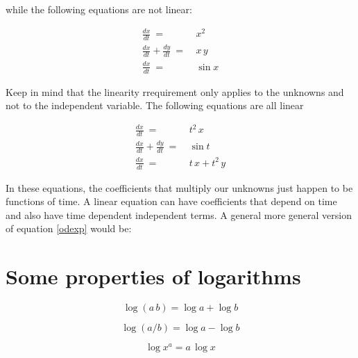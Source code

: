 \documentclass[12pt]{article}
\begin{document}
while the following equations are not linear:

\begin{align}
	\frac{dx}{dt} \: = \: &  x^2	\\
	\frac{dx}{dt} + \frac{dy}{dt}\: = \: &  x \, y \\
	\frac{dx}{dt} \: = \: &  \sin x 
\end{align}

Keep in mind that the linearity rrequirement only applies to the unknowns and not to the independent variable. The following equations are all linear


\begin{align}
	\frac{dx}{dt} \: = \: &  t^2 \, x	\\
	\frac{dx}{dt} + \frac{dy}{dt}\: = \: &  \sin t \\
	\frac{dx}{dt} \: = \: &  t \, x + t^2 \, y
\end{align}

In these equations, the coefficients that multiply our unknowns just happen to be functions of time. A linear equation can have coefficients that depend on time and also have time dependent independent terms. A general more general version of equation \ref{odexp} would be:




\appendix
\section{Some properties of logarithms}
\label{logprop}
\begin{equation}
 \log{(a \, b)} =	\log{a} + \log{b} 
\end{equation}

\begin{equation}
	\log{(a / b)} =	\log{a} - \log{b} 
\end{equation}

\begin{equation}
	\log{x^a} =a \, \log{x} 
\end{equation}
\end{document}
